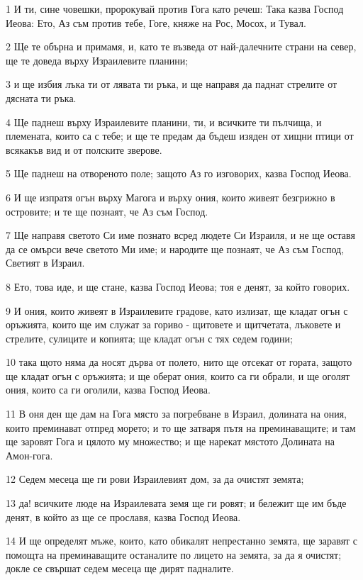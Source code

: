 \par 1 И ти, сине човешки, пророкувай против Гога като речеш: Така казва Господ Иеова: Ето, Аз съм против тебе, Гоге, княже на Рос, Мосох, и Тувал.
\par 2 Ще те обърна и примамя, и, като те възведа от най-далечните страни на север, ще те доведа върху Израилевите планини;
\par 3 и ще избия лъка ти от лявата ти ръка, и ще направя да паднат стрелите от дясната ти ръка.
\par 4 Ще паднеш върху Израилевите планини, ти, и всичките ти пълчища, и племената, които са с тебе; и ще те предам да бъдеш изяден от хищни птици от всякакъв вид и от полските зверове.
\par 5 Ще паднеш на отвореното поле; защото Аз го изговорих, казва Господ Иеова.
\par 6 И ще изпратя огън върху Магога и върху ония, които живеят безгрижно в островите; и те ще познаят, че Аз съм Господ.
\par 7 Ще направя светото Си име познато всред людете Си Израиля, и не ще оставя да се омърси вече светото Ми име; и народите ще познаят, че Аз съм Господ, Светият в Израил.
\par 8 Ето, това иде, и ще стане, казва Господ Иеова; тоя е денят, за който говорих.
\par 9 И ония, които живеят в Израилевите градове, като излизат, ще кладат огън с оръжията, които ще им служат за гориво - щитовете и щитчетата, лъковете и стрелите, сулиците и копията; ще кладат огън с тях седем години;
\par 10 така щото няма да носят дърва от полето, нито ще отсекат от гората, защото ще кладат огън с оръжията; и ще оберат ония, които са ги обрали, и ще оголят ония, които са ги оголили, казва Господ Иеова.
\par 11 В оня ден ще дам на Гога място за погребване в Израил, долината на ония, които преминават отпред морето; и то ще затваря пътя на преминаващите; и там ще заровят Гога и цялото му множество; и ще нарекат мястото Долината на Амон-гога.
\par 12 Седем месеца ще ги рови Израилевият дом, за да очистят земята;
\par 13 да! всичките люде на Израилевата земя ще ги ровят; и бележит ще им бъде денят, в който аз ще се прославя, казва Господ Иеова.
\par 14 И ще определят мъже, които, като обикалят непрестанно земята, ще заравят с помощта на преминаващите останалите по лицето на земята, за да я очистят; докле се свършат седем месеца ще дирят падналите.
